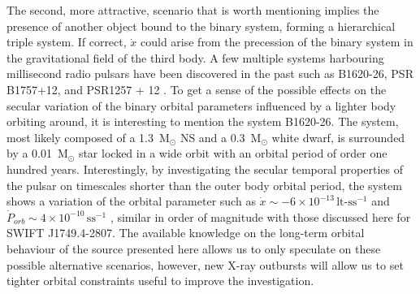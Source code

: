\documentclass[fleqn,usenatbib]{mnras}
\newcommand{\swiftj}{SWIFT J1749.4-2807}
\begin{document}
The second, more attractive, scenario that is worth mentioning implies the presence of another object bound to the binary system, forming a hierarchical triple system. If correct, $\dot{x}$ could arise from the precession of the binary system in the gravitational field of the third body. A few multiple systems harbouring millisecond radio pulsars have been discovered in the past such as B1620-26, PSR B1757+12, and PSR1257 + 12 \citep[see e.g.,][]{Thorsett:1999vo, Wolszczan:1992wd, Ransom:2014vb}. To get a sense of the possible effects on the secular variation of the binary orbital parameters influenced by a lighter body orbiting around, it is interesting to mention the system B1620-26. The system, most likely composed of a 1.3~M$_\odot$ NS and a 0.3~M$_\odot$ white dwarf, is surrounded by a 0.01~M$_\odot$ star locked in a wide orbit with an orbital period of order one hundred years. Interestingly, by investigating the secular temporal properties of the pulsar on timescales shorter than the outer body orbital period, the system shows a variation of the orbital parameter such as $\dot{x}\sim -6\times 10^{-13}\,\text{lt-s}\text{s}^{-1}$ and $\dot{P}_{orb}\sim4\times 10^{-10}\,\text{s}\text{s}^{-1}$ \citep{Thorsett:1999vo}, similar in order of magnitude with those discussed here for \swiftj{}. The available knowledge on the long-term orbital behaviour of the source presented here allows us to only speculate on these possible alternative scenarios, however, new X-ray outbursts will allow us to set tighter orbital constraints useful to improve the investigation.    
\end{document}

